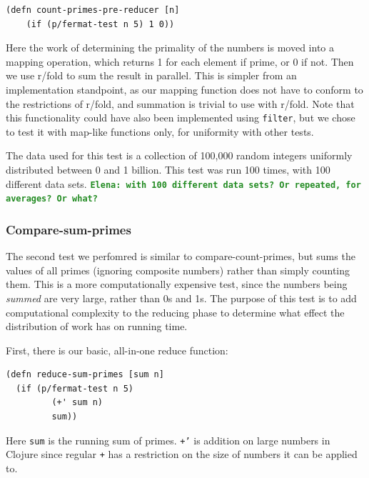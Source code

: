 \documentclass[12pt]{article}
\newcommand{\comment}[1]{{\bf \tt  {#1}}}
\newcommand{\emcomment}[1]{\textcolor{ForestGreen}{\comment{Elena: {#1}}}}
\newcommand{\joecomment}[1]{\textcolor{JoesGold}{\comment{Joe: {#1}}}}
\newcommand{\clocode}[1]{{\texttt {#1}}}
\begin{document}
\begin{verbatim}
(defn count-primes-pre-reducer [n] 
    (if (p/fermat-test n 5) 1 0))
\end{verbatim}

Here the work of determining the primality of the numbers is moved into a mapping operation, which returns 1 for each element if prime, or 0 if not. Then we use r/fold to sum the result in parallel. This is simpler from an implementation standpoint, as our mapping function does not have to conform to the restrictions of r/fold, and summation is trivial to use with r/fold. Note that this functionality could have also been implemented using \clocode{filter}, but we chose to test it with map-like functions only, for uniformity with other tests. 

The data used for this test is a collection of 100,000 random integers uniformly distributed between 0 and 1 billion. This test was run 100 times, with 100 different data sets. 
\emcomment{with 100 different data sets? Or repeated, for averages? Or what?}

  
\subsubsection{Compare-sum-primes}\label{sec:sum-primes}
The second test we perfomred is similar to compare-count-primes, but sums the values of all primes (ignoring composite numbers) rather than simply counting them. This is a more computationally expensive test, since the numbers being \emph{summed} are very large, rather than 0s and 1s. The purpose of this test is to add computational complexity to the %
reducing phase to determine what effect the distribution of work has on running time.

First, there is our basic, all-in-one reduce function:
\begin{verbatim}
(defn reduce-sum-primes [sum n]
  (if (p/fermat-test n 5)
         (+' sum n)
         sum))
\end{verbatim}
Here \clocode{sum} is the running sum of primes. \clocode{+'} is addition on large numbers in Clojure since regular \clocode{+} has a restriction on the size of numbers it can be applied to. 
\end{document}
